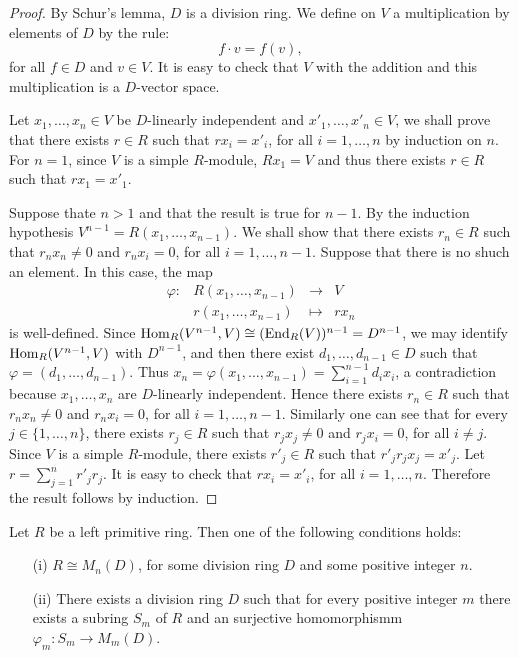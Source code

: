 \begin{proof} By Schur's lemma, $D$ is a division ring.
We define on $V$ a multiplication by elements of $D$ by the rule:
$$f\cdot v=f(v),$$
for all $f\in D$ and  $v\in V$. It is easy to check that $V$ with the addition and this multiplication is a $D$-vector space.

Let $x_1,\dots,x_n\in V$ be $D$-linearly 
independent and $x'_1,\dots,x'_n\in V$, we shall prove that there exists $r\in R$ such that $rx_i=x'_i$, for all $i=1,\dots,n$
by induction on $n$. 
For $n=1$, since $V$ is a simple $R$-module, $Rx_1=V$ and thus there exists $r\in R$ such that $rx_1=x'_1$.

Suppose thate $n>1$ and that the result is true for $n-1$.
By the induction hypothesis $V^{n-1}=R(x_1,\dots,x_{n-1})$. We shall show that there exists $r_n\in R$ 
such that $r_nx_n\neq 0$ and $r_nx_i=0$, for all
$i=1,\dots,n-1$. Suppose that there is no shuch an element. In this case, the map
$$\begin{array}{cccc}\varphi\colon &R(x_1,\dots,x_{n-1})&\rightarrow &V\\
&r(x_1,\dots,x_{n-1})&\mapsto &rx_n\end{array}$$
is well-defined. Since $\operatorname{Hom}_R(V^{n-1}, V)\cong
(\operatorname{End}_R(V))^{n-1}=D^{n-1}$, we may identify
$\operatorname{Hom}_R(V^{n-1}, V)$ with $D^{n-1}$, and then there exist
$d_1,\dots,d_{n-1}\in D$ such that $\varphi =(d_1,\dots,d_{n-1})$. Thus
$x_n=\varphi (x_1,\dots,x_{n-1})=\sum_{i=1}^{n-1}d_ix_i$, a contradiction because $x_1,\dots,x_n$ are $D$-linearly independent. 
Hence there exists $r_n\in R$ such that $r_nx_n\neq 0$ and $r_nx_i=0$, for all
$i=1,\dots,n-1$. Similarly one can see that for every $j\in\{ 1,\dots,n\}$,
there exists $r_j\in R$ such that $r_jx_j\neq 0$ and $r_jx_i=0$, for all
$i\neq j$. Since  $V$ is a simple $R$-module, there exists $r'_j\in R$
such that $r'_jr_jx_j=x'_j$. Let $r=\sum_{j=1}^nr'_jr_j$. It is easy to check that $rx_i=x'_i$, for all $i=1,\dots,n$. Therefore the result follows by induction.
\end{proof}

\begin{theorem}\label{Teorema 1.2.4}
Let $R$ be a left primitive ring. Then one of the following conditions holds:
\begin{itemize}
\item[(i)] $R\cong M_n(D)$, for some division ring $D$ and some positive integer $n$.
\item[(ii)] There exists a division ring $D$ such that for every positive integer $m$ there exists a subring $S_m$ of $R$ and an surjective homomorphismm $\varphi _m\colon S_m\rightarrow M_m(D)$.
\end{itemize}
\end{theorem}

